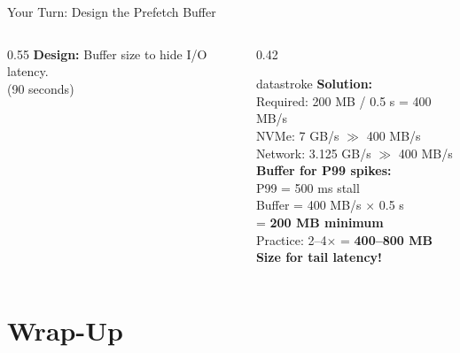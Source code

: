 \documentclass[aspectratio=169, 12pt]{beamer}
\begin{document}
\begin{frame}{Your Turn: Design the Prefetch Buffer}
\begin{columns}[T]
\begin{column}{0.55\textwidth}
    \vspace{0.1cm}
    \textbf{Design:} Buffer size to hide I/O latency.\\
    {\footnotesize\textcolor{midgray}{(90 seconds)}}
  \end{column}
  \begin{column}{0.42\textwidth}
    \pause
    \begin{mlsyscard}{datastroke}
    {\scriptsize \textbf{Solution:}\\
    Required: 200 MB / 0.5 s = 400 MB/s\\
    NVMe: 7 GB/s $\gg$ 400 MB/s \checkmark\\
    Network: 3.125 GB/s $\gg$ 400 MB/s \checkmark\\[0.1cm]
    \textbf{Buffer for P99 spikes:}\\
    P99 = 500 ms stall\\
    Buffer = 400 MB/s $\times$ 0.5 s\\
    = \textbf{200 MB minimum}\\
    Practice: 2--4$\times$ = \textbf{400--800 MB}\\[0.05cm]
    \textcolor{datastroke}{\textbf{Size for tail latency!}}}
    \end{mlsyscard}
  \end{column}
\end{columns}

\end{frame}

\section{Wrap-Up}
\end{document}
